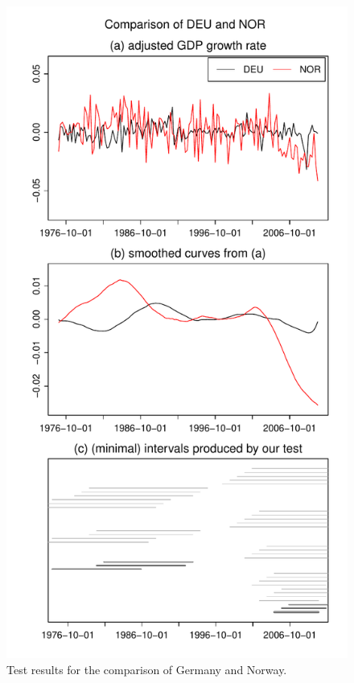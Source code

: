 \documentclass[a4paper,12pt]{article}
\begin{document}
\begin{figure}
\begin{minipage}[t]{0.24\textwidth}
\includegraphics[width=\textwidth]{output/plots/gdp/DEU_vs_NOR}
\caption{Test results for the comparison of Germany and Norway.}\label{fig:Germany:Norway}
\end{minipage}
\hspace{0.1cm}

\end{figure}
\end{document}

